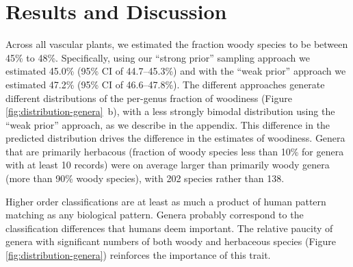 \documentclass[12pt]{article}
\begin{document}
\section{Results and Discussion}




Across all vascular plants, we estimated the fraction woody species to
be between 45\% to 48\%.
Specifically, using our ``strong prior'' sampling approach we
estimated 45.0\% (95\% CI of 44.7--45.3\%) and with the ``weak prior''
approach we estimated 47.2\% (95\% CI of 46.6--47.8\%).  
% 
The different approaches generate different distributions of the
per-genus fraction of woodiness (Figure
\ref{fig:distribution-genera}~b), with a less strongly bimodal
distribution using the ``weak prior'' approach, as we describe in the
appendix.
%
This difference in the predicted distribution drives the difference in
the estimates of woodiness.  Genera that are primarily herbacous
(fraction of woody species less than 10\% for genera with at least 10
records) were on average larger than primarily woody genera (more than
90\% woody species), with 202 species rather than 138.
%

Higher order classifications are at least as much a product of human
pattern matching as any biological pattern.  Genera probably
correspond to the classification differences that humans deem
important.  The relative paucity of genera with significant numbers of
both woody and herbaceous species (Figure
\ref{fig:distribution-genera}) reinforces the importance of this
trait.
\end{document}
